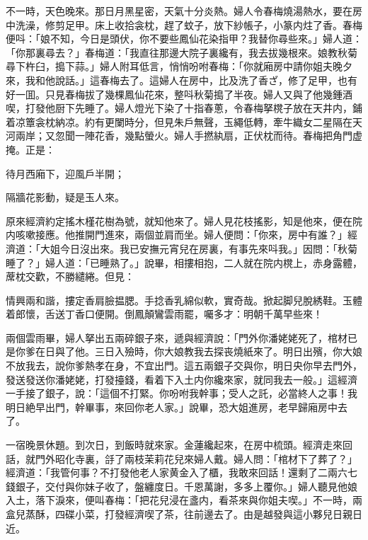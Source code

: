不一時，天色晚來。那日月黑星密，天氣十分炎熱。婦人令春梅燒湯熱水，要在房中洗澡，修剪足甲。床上收拾衾枕，趕了蚊子，放下紗帳子，小篆内炷了香。春梅便呌：「娘不知，今日是頭伏，你不要些鳳仙花染指甲？我替你尋些來。」婦人道：「你那裏尋去？」春梅道：「我直往那邊大院子裏纔有，我去拔幾根來。娘教秋菊尋下杵臼，搗下蒜。」婦人附耳低言，悄悄吩咐春梅：「你就廂房中請你姐夫晚夕來，我和他說話。」這春梅去了。這婦人在房中，比及洗了香ざ，修了足甲，也有好一囬。只見春梅拔了幾棵鳳仙花來，整呌秋菊搗了半夜。婦人又與了他幾鍾酒喫，打發他厨下先睡了。婦人燈光下染了十指春蔥，令春梅拏櫈子放在天井内，鋪着凉簟衾枕納凉。約有更闌時分，但見朱戶無聲，玉繩低轉，牽牛織女二星隔在天河兩岸；又忽聞一陣花香，幾點螢火。婦人手撚紈扇，正伏枕而待。春梅把角門虚掩。正是：

\begin{myquote}
待月西廂下，迎風戶半開；

隔牆花影動，疑是玉人來。
\end{myquote}

原來經濟約定搖木槿花樹為號，就知他來了。婦人見花枝搖影，知是他來，便在院内咳嗽接應。他推開門進來，兩個並肩而坐。婦人便問：「你來，房中有誰？」經濟道：「大姐今日沒出來。我已安撫元宵兒在房裏，有事先來呌我。」因問：「秋菊睡了？」婦人道：「已睡熟了。」說畢，相摟相抱，二人就在院内櫈上，赤身露體，蓆枕交歡，不勝繾綣。但見：

\begin{myquote}
情興兩和諧，摟定香肩臉揾腮。手捻香乳綿似軟，實奇哉。掀起脚兒脫綉鞋。玉體着郎懷，舌送丁香口便開。倒鳳顛鸞雲雨罷，囑多才：明朝千萬早些來！
\end{myquote}

兩個雲雨畢，婦人拏出五兩碎銀子來，遞與經濟說：「門外你潘姥姥死了，棺材已是你爹在日與了他。三日入殮時，你大娘教我去探丧燒紙來了。明日出殯，你大娘不放我去，說你爹熱孝在身，不宜出門。這五兩銀子交與你，明日央你早去門外，發送發送你潘姥姥，打發擡錢，看着下入土内你纔來家，就同我去一般。」這經濟一手接了銀子，說：「這個不打緊。你吩咐我幹事；受人之託，必當終人之事！我明日絶早出門，幹畢事，來回你老人家。」說畢，恐大姐進房，老早歸廂房中去了。

一宿晚景休題。到次日，到飯時就來家。金蓮纔起來，在房中梳頭。經濟走來回話，就門外昭化寺裏，㧱了兩枝茉莉花兒來婦人戴。婦人問：「棺材下了葬了？」經濟道：「我管何事？不打發他老人家黄金入了櫃，我敢來回話！還剩了二兩六七錢銀子，交付與你妹子收了，盤纏度日。千恩萬謝，多多上覆你。」婦人聽見他娘入土，落下淚來，便叫春梅：「把花兒浸在盞内，看茶來與你姐夫喫。」不一時，兩盒兒蒸酥，四碟小菜，打發經濟喫了茶，往前邊去了。由是越發與這小夥兒日親日近。

